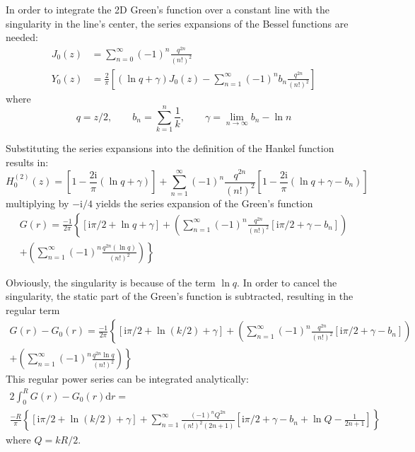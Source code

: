 \documentclass[a4paper,11pt]{article}
\newcommand{\td}{\mathrm{d}}
\newcommand{\ti}{\mathrm{i}}
\begin{document}
In order to integrate the 2D Green's function over a constant line with the singularity in the line's center, the series expansions of the Bessel functions are needed:
%
\begin{align}
J_0(z) &= \sum_{n=0}^{\infty} (-1)^n \frac{q^{2n}}{\left(n!\right)^2} \\
Y_0(z) &= \frac{2}{\pi} \left[
	\left(\ln q +\gamma\right)J_0(z)
	-
	\sum_{n=1}^{\infty} (-1)^{n} b_n \frac{q^{2n}}{\left(n!\right)^2}
\right]
\end{align}
%
where
%
\begin{equation}
q = z/2, \qquad b_n = \sum_{k=1}^n \frac{1}{k}, \qquad \gamma = \lim_{n\to\infty} b_n - \ln n
\end{equation}

Substituting the series expansions into the definition of the Hankel function results in:
%
\begin{equation}
H^{(2)}_0(z) =
\left[1 - \frac{2 \ti}{\pi} \left(\ln q +\gamma\right) \right]	
+
\sum_{n=1}^{\infty} (-1)^n \frac{q^{2n}}{\left(n!\right)^2}
\left[1 - \frac{2 \ti}{\pi} \left(\ln q +\gamma - b_n\right) \right]
\end{equation}
%
multiplying by $-\ti/4$ yields the series expansion of the Green's function
%
\begin{multline}
G(r) = \frac{-1}{2\pi} \left\{
\left[\ti\pi/2 + \ln q +\gamma \right]	
+ \left(\sum_{n=1}^{\infty}
(-1)^n \frac{q^{2n}}{\left(n!\right)^2}
\left[\ti\pi/2 + \gamma - b_n \right]	\right) \right. \\
\left.
+
\left(\sum_{n=1}^{\infty}
(-1)^n \frac{q^{2n}\left(\ln q\right)}{\left(n!\right)^2}
\right)
\right\}
\end{multline}

Obviously, the singularity is because of the term $\ln q$. In order to cancel the singularity, the static part of the Green's function is subtracted, resulting in the regular term
%
\begin{multline}
G(r)-G_0(r) = \frac{-1}{2\pi} \left\{
\left[\ti\pi/2 + \ln \left(k/2\right) +\gamma \right]	
+ 
\left(\sum_{n=1}^{\infty}
(-1)^n \frac{q^{2n}}{\left(n!\right)^2}
\left[\ti\pi/2 + \gamma - b_n \right]	\right) \right. \\
\left.
+
\left(\sum_{n=1}^{\infty}
(-1)^n \frac{q^{2n} \ln q}{\left(n!\right)^2}
\right)
\right\}
\end{multline}
%
This regular power series can be integrated analytically:
%
\begin{multline}
2\int_{0}^{R} G(r)-G_0(r) \td r
= \\
\frac{-R}{\pi} \left\{
\left[\ti\pi/2 + \ln \left(k/2\right) +\gamma \right]
+
\sum_{n=1}^{\infty}
\frac{(-1)^n Q^{2n}}{\left(n!\right)^2\left(2n+1\right)}
\left[\ti\pi/2 + \gamma - b_n + \ln Q - \frac{1}{2n + 1}\right]
\right\}
\end{multline}
%
where $Q = kR/2$.
\end{document}
